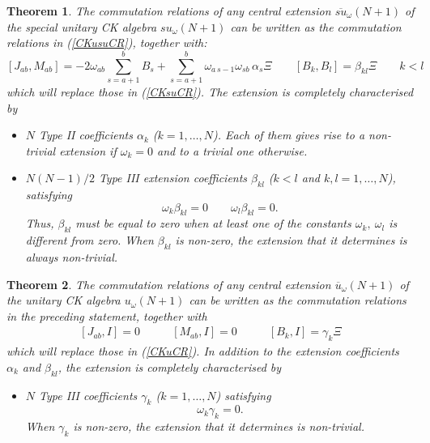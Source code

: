 \documentclass[12pt]{article}
\newtheorem{theorem}{Theorem}[section]
\begin{document}
\begin{theorem}
\label{theor4.1}
The  commutation relations of any central extension
$\overline{su}_{\omega}(N+1)$ of the special unitary CK algebra
${su}_{\omega}(N+1)$ can be written as the commutation relations in
(\ref{CKusuCR}), together with:
\begin{equation}
\displaystyle  [{J}_{ab},{M}_{ab}] = -2{\omega}_{ab}\sum_{s=a+1}^b {B}_s +
         \sum_{s=a+1}^b{\omega}_{a\,s-1}{\omega}_{sb}\,{\alpha}_{s} \Xi  \qquad
[{B}_k,{B}_l]={\beta}_{kl}\Xi\qquad k<l
\label{CKsuExtCR}
\end{equation}
which will replace those in (\ref{CKsuCR}). The extension is
completely characterised by

\begin{itemize}
\item $N$ Type II coefficients ${{\alpha}_{k}}$ ($k=1,\dots,N$).
Each of them gives rise to a non-trivial extension if
${\omega}_k= 0$ and to a trivial one otherwise.

\item $N(N-1)/2$ Type III extension coefficients ${\beta}_{kl}$
($k<l$ and
$k,l=1,\dots,N$), satisfying
\begin{equation}
 {\omega}_k {\beta}_{kl}=0\qquad {\omega}_l{\beta}_{kl}=0.
\label{eb}
\end{equation}
Thus, ${\beta}_{kl}$ must be equal to zero when at least one of the
constants ${\omega}_k,\ {\omega}_l$ is different from zero. When ${\beta}_{kl}$ is
non-zero, the extension that it determines is always non-trivial.
\end{itemize}
\end{theorem}

\begin{theorem}
\label{theor4.2}
The  commutation relations of any central extension
$\overline{u}_{\omega}(N+1)$ of the unitary CK algebra
${u}_{\omega}(N+1)$ can be written as the commutation relations in
the preceding statement, together with
\begin{equation}
\begin{array}{lll}
[{J}_{ab},{I}] = 0  & \qquad
[{M}_{ab},{I}] = 0  & \qquad
[{B}_k,{I}]={\gamma}_{k}\Xi
\label{CKuExtCR}
\end{array}
\end{equation}
which will replace those in (\ref{CKuCR}). In addition to the
extension coefficients ${{\alpha}_{k}}$ and ${\beta}_{kl}$, the
extension is completely characterised by
\begin{itemize}
\item
$N$ Type III coefficients ${{\gamma}_{k}}$ ($k=1,\dots,N$) satisfying
\begin{equation}
 {\omega}_k {\gamma}_{k}=0.
\end{equation}
When ${\gamma}_k$ is non-zero, the extension that it determines is non-trivial.
\end{itemize}
\end{theorem}
\end{document}
